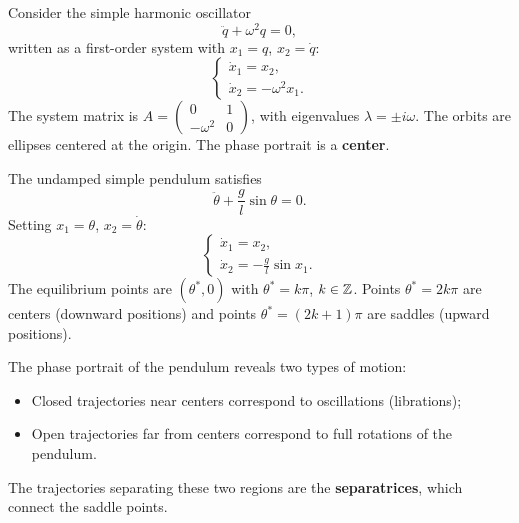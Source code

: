 \begin{example}
Consider the simple harmonic oscillator
\[
    \ddot{q} + \omega^2 q = 0,
\]
written as a first-order system with $x_1 = q$, $x_2 = \dot{q}$:
\[
    \begin{cases}
        \dot{x}_1 = x_2, \\
        \dot{x}_2 = -\omega^2 x_1.
    \end{cases}
\]
The system matrix is $A = \begin{pmatrix} 0 & 1 \\ -\omega^2 & 0 \end{pmatrix}$,
with eigenvalues $\lambda = \pm i\omega$. The orbits are ellipses centered
at the origin. The phase portrait is a \textbf{center}.
\end{example}

\begin{example}
\label{ex:pendulum}
The undamped simple pendulum satisfies
\[
    \ddot{\theta} + \frac{g}{l}\sin\theta = 0.
\]
Setting $x_1 = \theta$, $x_2 = \dot{\theta}$:
\[
    \begin{cases}
        \dot{x}_1 = x_2, \\
        \dot{x}_2 = -\frac{g}{l}\sin x_1.
    \end{cases}
\]
The equilibrium points are $(\theta^*, 0)$ with $\theta^* = k\pi$, $k \in \mathbb{Z}$.
Points $\theta^* = 2k\pi$ are centers (downward positions) and points
$\theta^* = (2k+1)\pi$ are saddles (upward positions).
\end{example}

\begin{intuition}
The phase portrait of the pendulum reveals two types of motion:
\begin{itemize}
    \item Closed trajectories near centers correspond to oscillations
    (librations);
    \item Open trajectories far from centers correspond to full rotations
    of the pendulum.
\end{itemize}
The trajectories separating these two regions are the \textbf{separatrices},
which connect the saddle points.
\end{intuition}

